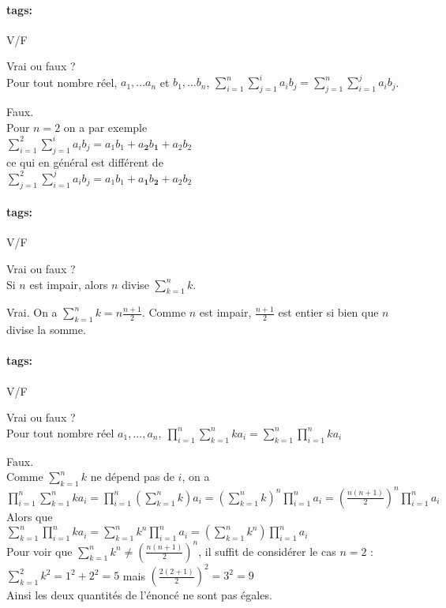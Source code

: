 \documentclass[12pt]{article}
\newcommand*{\xfield}[1]{\begin{mdframed}\centering #1\end{mdframed}\bigskip}
\newenvironment{note}{}{}
\newcommand*{\tags}[1]{\paragraph{tags: }#1}
\begin{document}
\begin{note}
\tags{V/F}
	\xfield{Vrai ou faux ?\\
	Pour tout nombre réel, $a_1,...a_n$ et $b_1,...b_n$, $\sum\limits^{n}_{i=1}\sum\limits^{i}_{j=1} a_i b_j = \sum\limits^{n}_{j=1}\sum\limits^{j}_{i=1}a_i b_j$.}
	\xfield{Faux.\\
	Pour $n=2$ on a par exemple\\
	$\sum\limits^{2}_{i=1}\sum\limits^{i}_{j=1} a_i b_j = a_1b_1+a_\mathbf{2}b_\mathbf{1}+a_2b_2$\\
	ce qui en général est différent de \\
	$\sum\limits^{2}_{j=1}\sum\limits^{j}_{i=1} a_i b_j = a_1b_1+a_\mathbf{1}b_\mathbf{2}+a_2b_2$}
\end{note}

\begin{note}
\tags{V/F}
	\xfield{Vrai ou faux ?\\
	Si $n$ est impair, alors $n$ divise $\sum\limits^{n}_{k=1} k$.}
	\xfield{Vrai. On a $\sum\limits^n_{k=1}k=n\frac{n+1}{2}$. Comme $n$ est impair, $\frac{n+1}{2}$ est entier si bien que $n$ divise la somme.}
\end{note}

\begin{note}
\tags{V/F}
	\xfield{Vrai ou faux ?\\
	Pour tout nombre réel $a_1,...,a_n,\ \prod\limits^n_{i=1}\sum\limits^n_{k=1}ka_i = \sum\limits^n_{k=1}\prod\limits^n_{i=1}ka_i$ }
	\xfield{Faux.\\
	Comme $\sum\limits^{n}_{k=1}k$ ne dépend pas de $i$, on a \\
	$\prod\limits^n_{i=1}\sum\limits^n_{k=1}ka_i = \prod\limits^n_{i=1} \left(\sum\limits^n_{k=1}k\right) a_i = (\sum\limits^n_{k=1}k)^n\prod\limits^n_{i=1}a_i = \left(\frac{n(n+1)}{2}\right)^n \prod\limits^n_{i=1}a_i$\\
	Alors que\\
	$\sum\limits^n_{k=1}\prod\limits^n_{i=1}ka_i = \sum\limits^n_{k=1}k^n\prod\limits^n_{i=1}a_i = \left(\sum\limits^n_{k=1}k^n\right) \prod\limits^n_{i=1}a_i$\\
	Pour voir que $\sum\limits^n_{k=1}k^n \neq \left( \frac{n(n+1)}{2}\right)^n$, il suffit de considérer le cas $n=2$ :\\
	$\sum\limits^2_{k=1}k^2 = 1^2+2^2=5$ mais $\left( \frac{2(2+1)}{2}\right)^2=3^2=9$\\
	Ainsi les deux quantités de l'énoncé ne sont pas égales.}
\end{note}
\end{document}

